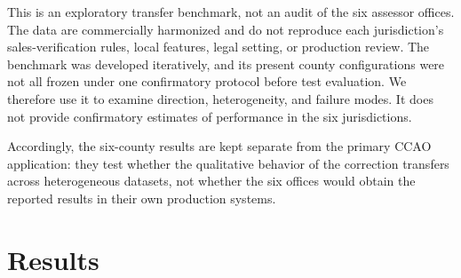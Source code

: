 \documentclass[10pt]{article}
\theoremstyle{definition}
\newcommand{\1}{\mathbf{1}}
\newcommand{\oldtext}[1]{\textcolor{blue}{\sout{#1}}}
\begin{document}
This is an exploratory transfer benchmark, not an audit of the six assessor offices. The data are commercially harmonized and do not reproduce each jurisdiction's sales-verification rules, local features, legal setting, or production review. The benchmark was developed iteratively, and its present county configurations were not all frozen under one confirmatory protocol before test evaluation. We therefore use it to examine direction, heterogeneity, and failure modes. It does not provide confirmatory estimates of performance in the six jurisdictions.

\textcolor{impGreen}{Accordingly, the six-county results are kept separate from the primary CCAO application: they test whether the qualitative behavior of the correction transfers across heterogeneous datasets, not whether the six offices would obtain the reported results in their own production systems.}

\section{Results}
\label{sec:results}

\end{document}
